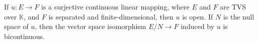 If $u: E \rightarrow F$ is a surjective continuous linear mapping, where $E$ and $F$ are TVS over $\mathbb{K}$, and $F$ is separated and finite-dimensional, then $u$ is open. If $N$ is the null space of $u$, then the vector space isomorphism $E/N \rightarrow F$ induced by $u$ is bicontinuous.